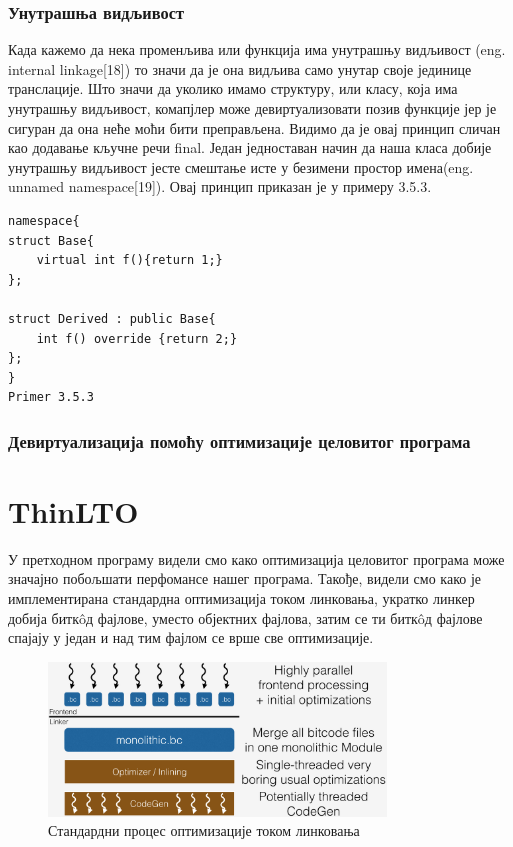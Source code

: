 \documentclass[12pt,oneside]{memoir}
\begin{document}
 \subsection{Унутрашња видљивост}
 Када кажемо да нека променљива или функција има унутрашњу видљивост
 (eng. internal linkage[18]) то значи да је она видљива само унутар своје јединице
 транслације.
 Што значи да уколико имамо структуру, или класу, која има унутрашњу видљивост,
 комапјлер може девиртуализовати позив функције јер је сигуран да она неће моћи бити
 преправљена.
 Видимо да је овај принцип сличан као додавање кључне речи  final.
 Један једноставан начин да наша класа добије унутрашњу видљивост јесте смештање исте
 у безимени простор имена(eng. unnamed namespace[19]).
 Овај принцип приказан је у примеру 3.5.3.
 
 \begin{lstlisting}
namespace{
struct Base{
    virtual int f(){return 1;}
};

struct Derived : public Base{
    int f() override {return 2;}
};
}
Primer 3.5.3
\end{lstlisting}
 
\subsection{Девиртуализација помоћу оптимизације целовитог програма}
 
 
 \chapter{ThinLTO}
 
 У претходном програму видели смо како оптимизација целовитог програма може значајно
 побољшати перфомансе нашег програма.
 Такође, видели смо како је имплементирана стандардна оптимизација током линковања,
 укратко линкер добија битк\^{o}д фајлове, уместо објектних фајлова, затим се ти
 битк\^{o}д фајлове спајају у један и над тим фајлом се врше све оптимизације.
 
\begin{figure}[!ht]
  \centering
  \includegraphics[width=0.8\textwidth]{LTO_normal.png}
  \caption{Стандардни процес оптимизације током линковања}
  \label{fig:grafikon}
\end{figure}
\end{document}
